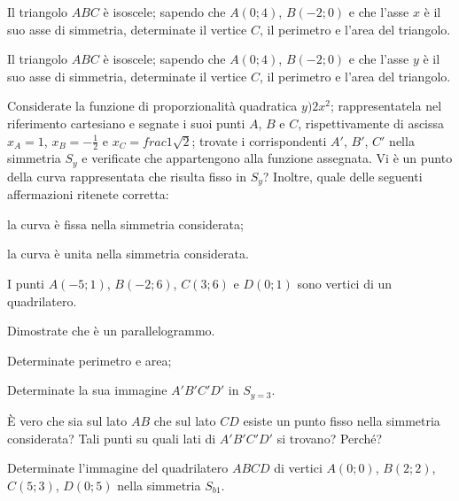 \begin{esercizio}
\label{ese:8.29} %
Il triangolo $ABC$ è isoscele; sapendo che $A(0;4)$, $B(-2;0)$ e che l'asse $x$ è il suo asse di simmetria, determinate il vertice $C$, il perimetro e l'area del triangolo.
\end{esercizio}

\begin{esercizio}
\label{ese:8.30} %
Il triangolo $ABC$ è isoscele; sapendo che $A(0;4)$, $B(-2;0)$ e che l'asse $y$ è il suo asse di simmetria, determinate il vertice $C$, il perimetro e l'area del triangolo.
\end{esercizio}

\begin{esercizio}
\label{ese:8.31} %
Considerate la funzione di proporzionalità quadratica $y)2x^2$; rappresentatela nel riferimento cartesiano e segnate i suoi punti $A$, $B$ e $C$, rispettivamente di ascissa $x_A=1$, $x_B=-\frac{1}{2}$ e $x_C=frac{1}{\sqrt{2}}$; trovate i corrispondenti $A'$, $B'$, $C'$ nella simmetria $S_y$ e verificate che appartengono alla funzione assegnata. Vi è un punto della curva rappresentata che risulta fisso in $S_y$? Inoltre, quale delle seguenti affermazioni ritenete corretta:
\begin{enumeratea}
\item la curva è fissa nella simmetria considerata;
\item la curva è unita nella simmetria considerata.
\end{enumeratea}
\end{esercizio}

\begin{esercizio}
\label{ese:8.32} %
I punti $A(-5;1)$, $B(-2;6)$, $C(3;6)$ e $D(0;1)$ sono vertici di un quadrilatero.
\begin{enumeratea}
\item Dimostrate che è un parallelogrammo.
\item Determinate perimetro e area;
\item Determinate la sua immagine $A'B'C'D'$ in $S_{y=3}$.
\end{enumeratea}
\`E vero che sia sul lato $AB$ che sul lato $CD$ esiste un punto fisso nella simmetria considerata? Tali punti su quali lati di $A'B'C'D'$ si trovano? Perché?
\end{esercizio}

\begin{esercizio}
\label{ese:8.33} %
Determinate l'immagine del quadrilatero $ABCD$ di vertici $A(0;0)$, $B(2;2)$, $C(5;3)$, $D(0;5)$ nella simmetria $S_{b1}$.
\end{esercizio}

